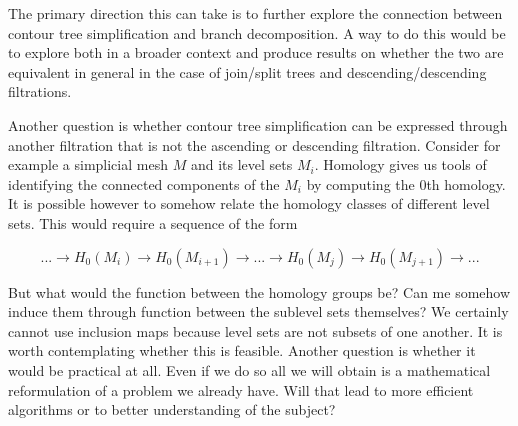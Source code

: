 
The primary direction this can take is to further explore the connection between contour tree simplification and branch decomposition. A way to do this would be to explore both in a broader context and produce results on whether the two are equivalent in general in the case of join/split trees and descending/descending filtrations.

Another question is whether contour tree simplification can be expressed through another filtration that is not the ascending or descending filtration. Consider for example a simplicial mesh $M$ and its level sets $M_i$. Homology gives us tools of identifying the connected components of the $M_i$ by computing the 0th homology. It is possible however to somehow relate the homology classes of different level sets. This would require a sequence of the form

$$ ... \rightarrow H_0(M_i) \rightarrow H_0(M_{i+1}) \rightarrow ... \rightarrow H_0(M_{j}) \rightarrow H_0(M_{j+1}) \rightarrow ...$$

But what would the function between the homology groups be? Can me somehow induce them through function between the sublevel sets themselves? We certainly cannot use inclusion maps because level sets are not subsets of one another. It is worth contemplating whether this is feasible. Another question is whether it would be practical at all. Even if we do so all we will obtain is a mathematical reformulation of a problem we already have. Will that lead to more efficient algorithms or to better understanding of the subject?

%
%

